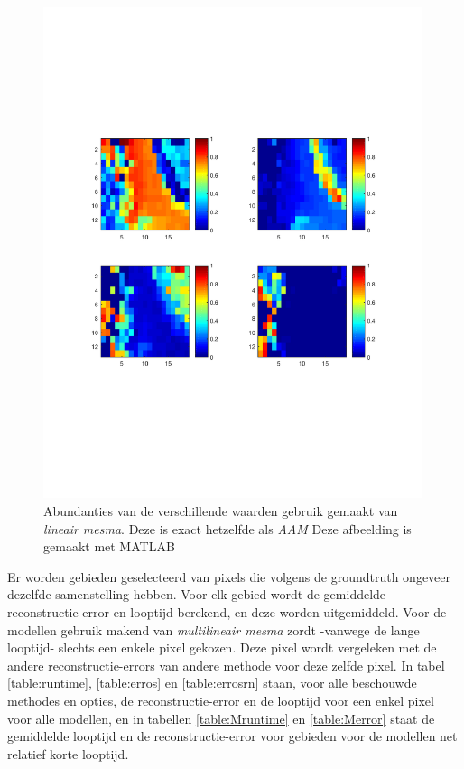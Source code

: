 \documentclass[12pt]{report}
\begin{document}
\begin{figure}
\includegraphics[width=0.99\textwidth,trim=0 200 0 175 cm]{linMESMA.pdf}
\caption{Abundanties van de verschillende waarden gebruik gemaakt van \textit{lineair mesma}. Deze is exact hetzelfde als \textit{AAM} Deze afbeelding is gemaakt met MATLAB\cite{matlab} \label{fig:lres}}
\end{figure}


Er worden gebieden geselecteerd van pixels die volgens de groundtruth ongeveer dezelfde samenstelling hebben. Voor elk gebied wordt de gemiddelde reconstructie-error en looptijd berekend, en deze worden uitgemiddeld. Voor de modellen gebruik makend van \textit{multilineair mesma} zordt -vanwege de lange looptijd- slechts een enkele pixel gekozen. Deze pixel wordt vergeleken met de andere reconstructie-errors van andere methode voor deze zelfde pixel. In tabel \ref{table:runtime}, \ref{table:erros} en \ref{table:errosrn} staan, voor alle beschouwde methodes en opties, de reconstructie-error en de looptijd voor een enkel pixel voor alle modellen, en in tabellen \ref{table:Mruntime} en \ref{table:Merror} staat de gemiddelde looptijd en de reconstructie-error voor gebieden voor de modellen net relatief korte looptijd.
\end{document}
